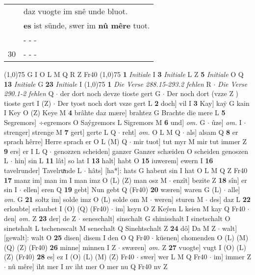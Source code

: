 \documentclass[8pt,a4paper,notitlepage]{article}
\begin{document}
\begin{table}[ht]
\begin{minipage}[t]{0.5\linewidth}
\begin{tabular}{rl}
 & daz vuogte im snê unde bluot.\\ 
 & \textbf{es} ist sünde, swer im \textbf{nû mêre} tuot.\\ 
 & \multicolumn{1}{l}{ - - - }\\ 
30 & \multicolumn{1}{l}{ - - - }\\ 
\end{tabular}
\scriptsize
\line(1,0){75} \newline
G I O L M Q R Z Fr40 \newline
\line(1,0){75} \newline
\textbf{1} \textit{Initiale} I  \textbf{3} \textit{Initiale} L Z  \textbf{5} \textit{Initiale} O Q  \textbf{13} \textit{Initiale} G  \textbf{23} \textit{Initiale} I  \newline
\line(1,0){75} \newline
\textbf{1} \textit{Die Verse 288.15-293.2 fehlen} R   $\cdot$ \textit{Die Verse 290.1-2 fehlen} Q   $\cdot$ der dort noch devze tioste gert G  $\cdot$ Der noch dort (vzze Z ) tioste gert I (Z)  $\cdot$ Der tyost noch dort vsze gert L \textbf{2} doch] vil I \textbf{3} Kay] kaẏ G kain I Key O (Z) Keye M \textbf{4} brâhte daz mære] brahtez G Brachte die mere L \textbf{5} Segremors] ÷egremors O Saýgremors L Sigremors M \textbf{6} und] \textit{om.} G  $\cdot$ ûze] \textit{om.} I  $\cdot$ strenger] strenge M \textbf{7} gert] gerte L Q  $\cdot$ reht] \textit{om.} O L M Q  $\cdot$ als] alsam Q \textbf{8} er sprach hêrre] Herre sprach er O L (M) Q  $\cdot$ mir tuot] tut myr M mir tut immer Z \textbf{9} ers] er I L Q  $\cdot$ genozzen scheiden] ganzer Ganzer schæiden O scheiden genoszen L  $\cdot$ hin] sin L \textbf{11} lât] so lat I \textbf{13} halt] habt O \textbf{15} iuwerem] ewern I \textbf{16} tavelrunder] Tavelruͯnde L  $\cdot$ hâts] [ha*]: hats G habent sin I hat O L M Q Z Fr40 \textbf{17} manz im] man im I man imz O (L) (Z) man osz M  $\cdot$ enzît] bezite Z \textbf{18} sîn] er sin I  $\cdot$ ellen] eren Q \textbf{19} gebt] Nun gebt Q (Fr40) \textbf{20} wæren] waren G (L)  $\cdot$ alle] \textit{om.} G \textbf{21} soltz im] solde imz O (L) solde om M  $\cdot$ weren] sturen M  $\cdot$ des] daz L \textbf{22} erloubte] erlaubet I (O) (Q) (Fr40)  $\cdot$ im] keyn O Z Keýen L keien M kay Q Fr40  $\cdot$ den] \textit{om.} Z \textbf{23} der] de Z  $\cdot$ seneschalt] sinschalt G shinisshalt I sinetschalt O sinetshalt L tschenescalt M senechalt Q Sinehtschalt Z \textbf{24} dô] Da M Z  $\cdot$ walt] [gewalt]: walt O \textbf{25} disen] disem I den O Q Fr40  $\cdot$ küenen] chomenden O (L) (M) (Q) (Z) (Fr40) \textbf{26} minne] minnen I Z  $\cdot$ swæren] \textit{om.} Z \textbf{27} vuogte] vugt I (O) (L) (Z) (Fr40) \textbf{28} es] ez I (O) (L) (M) (Z) Fr40  $\cdot$ swer] wer L M Q Fr40  $\cdot$ im] immer Z  $\cdot$ nû mêre] iht mer I nv iht mer O mer nu Q Fr40 nv Z \newline

\end{minipage}
\end{table}
\end{document}

